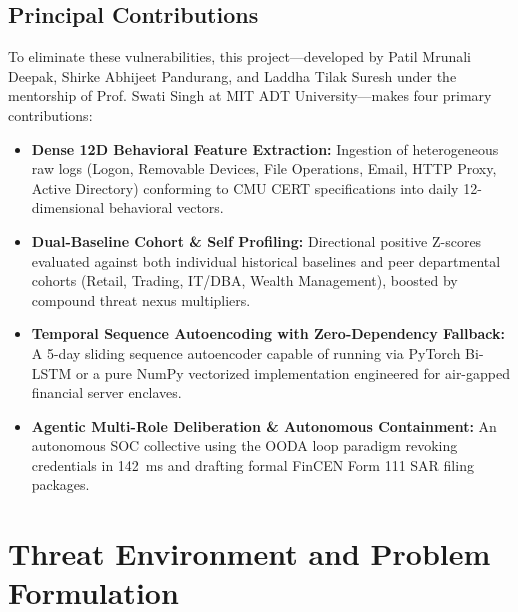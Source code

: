 \documentclass[conference]{IEEEtran}
\begin{document}
\subsection{Principal Contributions}
To eliminate these vulnerabilities, this project---developed by Patil Mrunali Deepak, Shirke Abhijeet Pandurang, and Laddha Tilak Suresh under the mentorship of Prof. Swati Singh at MIT ADT University---makes four primary contributions:
\begin{itemize}
    \item \textbf{Dense 12D Behavioral Feature Extraction:} Ingestion of heterogeneous raw logs (Logon, Removable Devices, File Operations, Email, HTTP Proxy, Active Directory) conforming to CMU CERT specifications into daily 12-dimensional behavioral vectors.
    \item \textbf{Dual-Baseline Cohort \& Self Profiling:} Directional positive Z-scores evaluated against both individual historical baselines and peer departmental cohorts (Retail, Trading, IT/DBA, Wealth Management), boosted by compound threat nexus multipliers.
    \item \textbf{Temporal Sequence Autoencoding with Zero-Dependency Fallback:} A 5-day sliding sequence autoencoder capable of running via PyTorch Bi-LSTM or a pure NumPy vectorized implementation engineered for air-gapped financial server enclaves.
    \item \textbf{Agentic Multi-Role Deliberation \& Autonomous Containment:} An autonomous SOC collective using the OODA loop paradigm revoking credentials in 142~ms and drafting formal FinCEN Form 111 SAR filing packages.
\end{itemize}

\section{Threat Environment and Problem Formulation}
\end{document}
